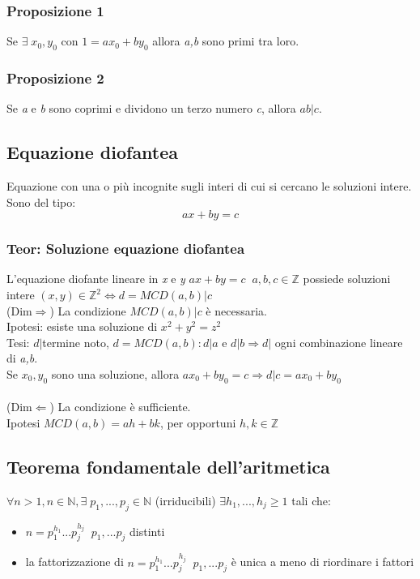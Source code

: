 \subsubsection{Proposizione 1}
Se \(\exists\; x_0,y_0\) con \(1=ax_0+by_0\) allora \textit{a,b} sono primi tra loro.

\subsubsection{Proposizione 2}
Se \textit{a} e \textit{b} sono coprimi e dividono un terzo numero \textit{c}, allora \(ab|c\).

\subsection{Equazione diofantea}
Equazione con una o più incognite sugli interi di cui si cercano le soluzioni intere. Sono del tipo:
\[ax+by=c\]

\subsubsection{Teor: Soluzione equazione diofantea}
L'equazione diofante lineare in \textit{x} e \textit{y} \(ax+by=c\;\; a,b,c\in\mathbb{Z}\) possiede soluzioni intere \((x,y)\in\mathbb{Z}^2\Leftrightarrow d=MCD(a,b)|c\)
\\
(Dim\(\Rightarrow\)) La condizione \(MCD(a,b)|c\) è necessaria.
\\
Ipotesi: esiste una soluzione di \(x^2+y^2=z^2\)
\\
Tesi: \(d|\)termine noto, \(d=MCD(a,b): d|a\) e \(d|b\Rightarrow d|\) ogni combinazione lineare di \textit{a,b}.
\\
Se \(x_0,y_0\) sono una soluzione, allora \(ax_0+by_0=c\Rightarrow d|c=ax_0+by_0\)
\\\\
(Dim\(\Leftarrow\)) La condizione è sufficiente.
\\
Ipotesi \(MCD(a,b)=ah+bk\), per opportuni \(h,k\in\mathbb{Z}\)

\subsection{Teorema fondamentale dell'aritmetica}
\(\forall n>1, n\in\mathbb{N},\exists\;p_1,...,p_j\in\mathbb{N}\) (irriducibili) \(\exists h_1,...,h_j\geq 1\) tali che:
\begin{itemize}
    \item \(n=p_1^{h_1}...p_j^{h_j}\;\;p_1,...p_j\) distinti
    \item la fattorizzazione di \(n=p_1^{h_1}...p_j^{h_j}\;\;p_1,...p_j\) è unica a meno di riordinare i fattori
\end{itemize}

